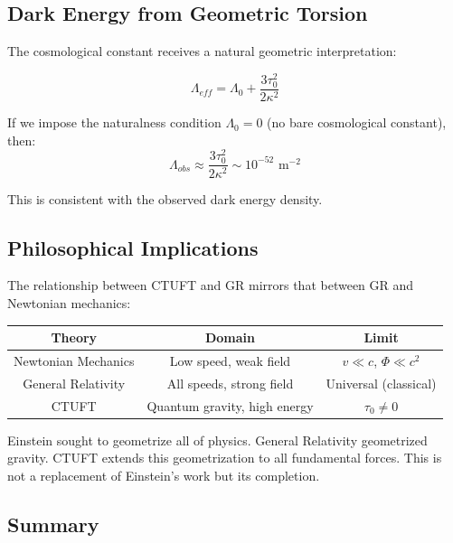 \subsection{Dark Energy from Geometric Torsion}

The cosmological constant receives a natural geometric interpretation:

\begin{equation}
    \Lambda_{eff} = \Lambda_0 + \frac{3\tau_0^2}{2\kappa^2}
    \label{eq:dark_energy_torsion}
\end{equation}

If we impose the naturalness condition $\Lambda_0 = 0$ (no bare cosmological constant), then:
\begin{equation}
    \Lambda_{obs} \approx \frac{3\tau_0^2}{2\kappa^2} \sim 10^{-52} \text{ m}^{-2}
\end{equation}

This is consistent with the observed dark energy density.

\subsection{Philosophical Implications}

The relationship between CTUFT and GR mirrors that between GR and Newtonian mechanics:

\begin{center}
\begin{tabular}{@{}ccc@{}}
\hline
Theory & Domain & Limit \\
\hline
Newtonian Mechanics & Low speed, weak field & $v \ll c$, $\Phi \ll c^2$ \\
General Relativity & All speeds, strong field & Universal (classical) \\
CTUFT & Quantum gravity, high energy & $\tau_0 \neq 0$ \\
\hline
\end{tabular}
\end{center}

\begin{remark}
Einstein sought to geometrize all of physics. General Relativity geometrized gravity. CTUFT extends this geometrization to all fundamental forces. This is not a replacement of Einstein's work but its completion.
\end{remark}

\subsection{Summary}

